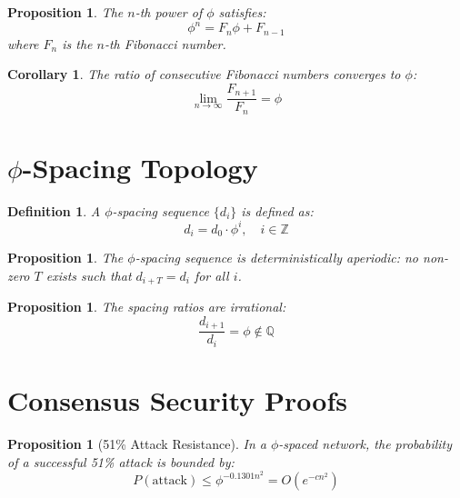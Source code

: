 \documentclass[12pt]{article}
\newtheorem lemma}[theorem]{Lemma}
\newtheorem{prop}[theorem]{Proposition}
\newtheorem{cor}[theorem]{Corollary}
\newtheorem{definition}{Definition}
\begin{document}
\begin{prop}
The $n$-th power of $\phi$ satisfies:
\begin{equation}
\phi^n = F_n \phi + F_{n-1}
\label{eq:phi_fib}
\end{equation}
where $F_n$ is the $n$-th Fibonacci number.
\end{prop}

\begin{cor}
The ratio of consecutive Fibonacci numbers converges to $\phi$:
\begin{equation}
\lim_{n\to\infty} \frac{F_{n+1}}{F_n} = \phi
\label{eq:fib_limit}
\end{equation}
\end{cor}

\section{$\phi$-Spacing Topology}

\begin{definition}
A $\phi$-spacing sequence $\{d_i\}$ is defined as:
\begin{equation}
d_i = d_0 \cdot \phi^i, \quad i \in \mathbb{Z}
\label{eq:phi_spacing}
\end{equation}
\end{definition}

\begin{prop}
The $\phi$-spacing sequence is deterministically aperiodic: no non-zero $T$ exists such that $d_{i+T} = d_i$ for all $i$.
\end{prop}

\begin{prop}
The spacing ratios are irrational:
\begin{equation}
\frac{d_{i+1}}{d_i} = \phi \notin \mathbb{Q}
\label{eq:irrational}
\end{equation}
\end{prop}

\section{Consensus Security Proofs}

\begin{prop}[51\% Attack Resistance]
In a $\phi$-spaced network, the probability of a successful 51\% attack is bounded by:
\begin{equation}
P(\text{attack}) \leq \phi^{-0.1301n^2} = O(e^{-cn^2})
\label{eq:attack_bound}
\end{equation}
\end{prop}
\end{document}
